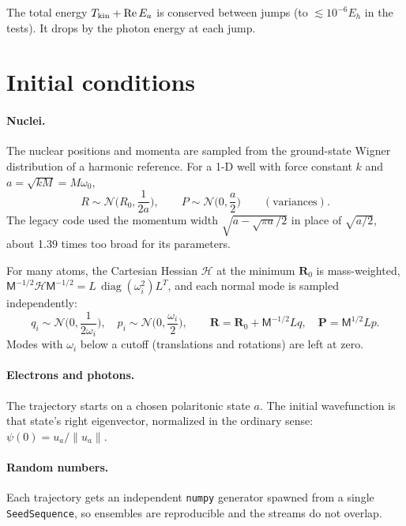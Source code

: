 \documentclass[11pt]{article}
\newcommand{\R}{\mathbf{R}}
\newcommand{\Pv}{\mathbf{P}}
\newcommand{\Mm}{\mathsf{M}}
\newcommand{\Rep}{\operatorname{Re}}
\newcommand{\code}[1]{\texttt{#1}}
\begin{document}
The total energy $T_{\rm kin}+\Rep E_a$ is conserved between jumps (to $\lesssim10^{-6}E_h$ in the tests). It drops by the photon energy at each jump.

\section{Initial conditions}
\paragraph{Nuclei.} The nuclear positions and momenta are sampled from the ground-state Wigner distribution of a harmonic reference. For a 1-D well with force constant $k$ and $a=\sqrt{kM}=M\omega_0$,
\begin{equation}
R\sim\mathcal N\!\Big(R_0,\frac{1}{2a}\Big),\qquad P\sim\mathcal N\!\Big(0,\frac{a}{2}\Big)\qquad(\text{variances}).
\end{equation}
The legacy code used the momentum width $\sqrt{a-\sqrt{\pi a}/2}$ in place of $\sqrt{a/2}$, about 1.39 times too broad for its parameters.

For many atoms, the Cartesian Hessian $\mathcal H$ at the minimum $\R_0$ is mass-weighted, $\Mm^{-1/2}\mathcal H\Mm^{-1/2}=L\,\operatorname{diag}(\omega_i^2)L^T$, and each normal mode is sampled independently:
\begin{equation}
q_i\sim\mathcal N\!\Big(0,\frac{1}{2\omega_i}\Big),\quad p_i\sim\mathcal N\!\Big(0,\frac{\omega_i}{2}\Big),\qquad
\R=\R_0+\Mm^{-1/2}Lq,\quad \Pv=\Mm^{1/2}Lp .
\end{equation}
Modes with $\omega_i$ below a cutoff (translations and rotations) are left at zero.

\paragraph{Electrons and photons.} The trajectory starts on a chosen polaritonic state $a$. The initial wavefunction is that state's right eigenvector, normalized in the ordinary sense: $\psi(0)=u_a/\|u_a\|$.

\paragraph{Random numbers.} Each trajectory gets an independent \code{numpy} generator spawned from a single \code{SeedSequence}, so ensembles are reproducible and the streams do not overlap.
\end{document}
